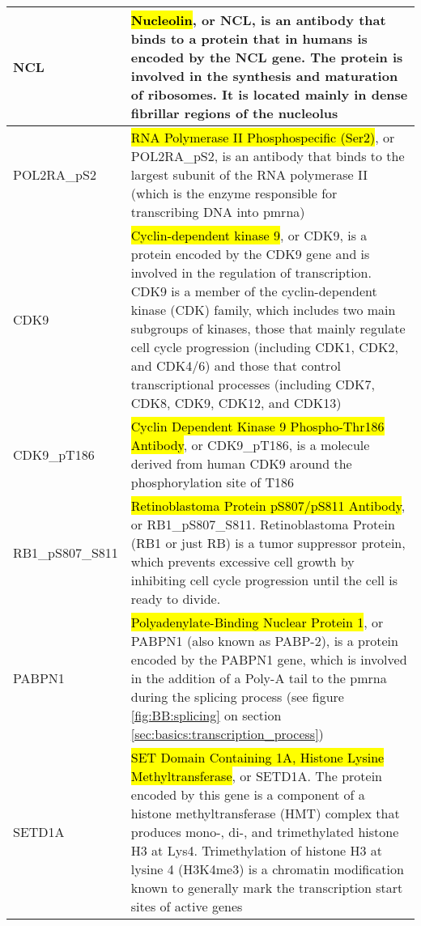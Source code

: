 \begin{longtable}{>{\centering\arraybackslash}m{\mylengtha} | m{\mylengthb}}
    \hline
    NCL & \hl{Nucleolin}, or NCL, is an antibody that binds to a protein that in humans is encoded by the NCL gene. The protein is involved in the synthesis and maturation of ribosomes. It is located mainly in dense fibrillar regions of the nucleolus \cite{erard1988major} \\
    \hline
    POL2RA\_pS2 & \hl{RNA Polymerase II Phosphospecific (Ser2)}, or POL2RA\_pS2, is an antibody that binds to the largest subunit of the RNA polymerase II (which is the enzyme responsible for transcribing DNA into \gls{pmrna}) \cite{POLR2ApS2} \\
    \hline
    CDK9 & \hl{Cyclin-dependent kinase 9}, or CDK9, is a protein encoded by the CDK9 gene and is involved in the regulation of transcription. CDK9 is a member of the cyclin-dependent kinase (CDK) family, which includes two main subgroups of kinases, those that mainly regulate cell cycle progression (including CDK1, CDK2, and CDK4/6) and those that control transcriptional processes (including CDK7, CDK8, CDK9, CDK12, and CDK13) \cite{cassandri2020cdk9} \\
    \hline
    CDK9\_pT186 & \hl{Cyclin Dependent Kinase 9 Phospho-Thr186 Antibody}, or CDK9\_pT186, is a molecule derived from human CDK9 around the phosphorylation site of T186 \cite{CDK9pT186} \\
    \hline
    RB1\_pS807\_S811 & \hl{Retinoblastoma Protein pS807/pS811 Antibody}, or RB1\_pS807\_S811. Retinoblastoma Protein (RB1 or just RB) is a tumor suppressor protein, which prevents excessive cell growth by inhibiting cell cycle progression until the cell is ready to divide.  \cite{murphree1984retinoblastoma} \\
    \hline
    PABPN1 & \hl{Polyadenylate-Binding Nuclear Protein 1}, or PABPN1 (also known as PABP-2), is a protein encoded by the PABPN1 gene, which is involved in the addition of a Poly-A tail to the \gls{pmrna} during the splicing process (see figure \ref{fig:BB:splicing} on section \ref{sec:basics:transcription_process}) \cite{muniz2015poly} \\
    \hline
    SETD1A & \hl{SET Domain Containing 1A, Histone Lysine Methyltransferase}, or SETD1A. The protein encoded by this gene is a component of a histone methyltransferase (HMT) complex that produces mono-, di-, and trimethylated histone H3 at Lys4. Trimethylation of histone H3 at lysine 4 (H3K4me3) is a chromatin modification known to generally mark the transcription start sites of active genes \cite{SETD1A} \\
    \hline

\end{longtable}
